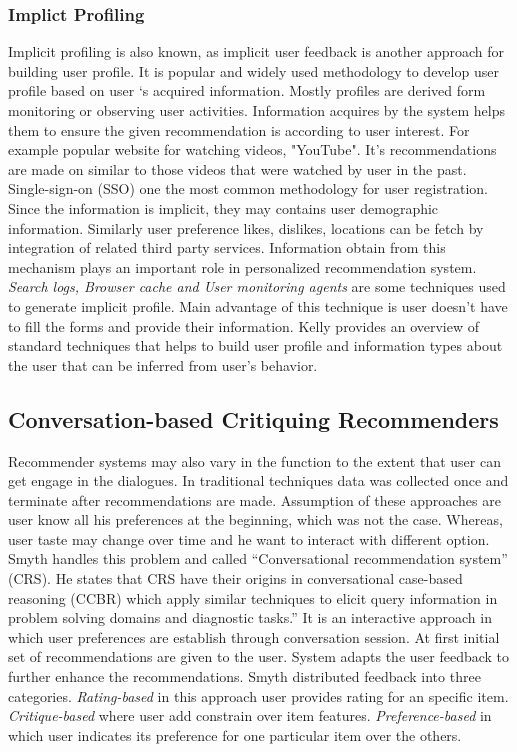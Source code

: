 \subsubsection{Implict Profiling}

Implicit profiling is also known, as implicit user feedback is another approach for building user profile. It is popular and widely used methodology to develop user profile based on user ‘s acquired information. Mostly profiles are derived form monitoring or observing user activities.  Information acquires by the system helps them to ensure the given recommendation is according to user interest. For example popular website for watching videos, "YouTube". It's recommendations are made on similar to those videos that were watched by user in the past. Single-sign-on (SSO) \cite{hursti1997single} one the most common methodology for user registration. Since the information is implicit, they may contains user demographic information. Similarly user preference likes, dislikes, locations can be fetch by integration of related third party services. Information obtain from this mechanism plays an important role in personalized recommendation system. \textit{Search logs, Browser cache and User monitoring agents} are some techniques used to generate implicit profile. Main advantage of this technique is user doesn’t have to fill the forms and provide their information. Kelly \cite{schiaffino2009intelligent} provides an overview of standard techniques that helps to build user profile and information types about the user that can be inferred from user’s behavior.\newline

\subsection{Conversation-based Critiquing Recommenders}

Recommender systems may also vary in the function to the extent that user can get engage in the dialogues. In traditional techniques data was collected once and terminate after recommendations are made. Assumption of these approaches are user know all his preferences at the beginning, which was not the case. Whereas, user taste may change over time and he want to interact with different option. Smyth \cite{ mcginty2003role} handles this problem and called “Conversational recommendation system” (CRS). He states that CRS have their origins in conversational case-based reasoning (CCBR) which apply similar techniques to elicit query information in problem solving domains and diagnostic tasks.” It is an interactive approach in which user preferences are establish through conversation session. At first initial set of recommendations are given to the user. System adapts the user feedback to further enhance the recommendations. Smyth \cite{ mcginty2003role} distributed feedback into three categories.\textit{ Rating-based} in this approach user provides rating for an specific item.\textit{ Critique-based} where user add constrain over item features.\textit{ Preference-based } in which user indicates its preference for one particular item over the others.\newline

